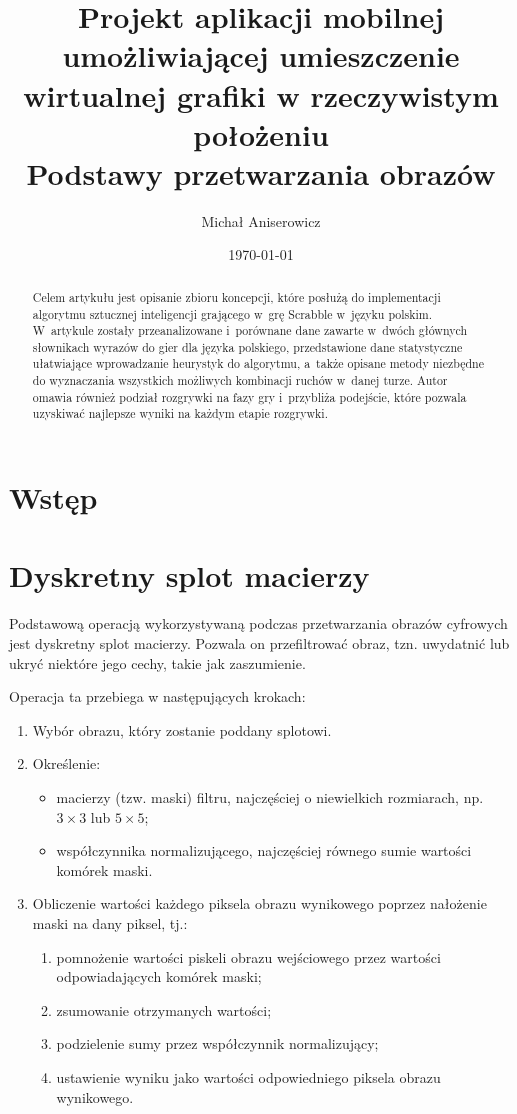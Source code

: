 \documentclass[a4paper,twocolumn,12pt]{article}
\title{
 \LARGE{Projekt aplikacji mobilnej umożliwiającej umieszczenie wirtualnej grafiki w rzeczywistym położeniu} 
 \\ \vspace{2mm} 
 \large{Podstawy przetwarzania obrazów}
}
\author{Michał Aniserowicz}
\date{\today}
\begin{document}
\maketitle

\begin{abstract}
Celem artykułu jest opisanie zbioru koncepcji, które posłużą do implementacji algorytmu sztucznej inteligencji grającego w~grę Scrabble w~języku polskim. W~artykule zostały przeanalizowane i~porównane dane zawarte w~dwóch głównych słownikach wyrazów do gier dla języka polskiego, przedstawione dane statystyczne ułatwiające wprowadzanie heurystyk do algorytmu, a~także opisane metody niezbędne do wyznaczania wszystkich możliwych kombinacji ruchów w~danej turze. Autor omawia również podział rozgrywki na fazy gry i~przybliża podejście, które pozwala uzyskiwać najlepsze wyniki na każdym etapie rozgrywki.
\end{abstract}

\section{Wstęp}



\section{Dyskretny splot macierzy}

Podstawową operacją wykorzystywaną podczas przetwarzania obrazów cyfrowych jest dyskretny splot macierzy.
Pozwala on przefiltrować obraz, tzn. uwydatnić lub ukryć niektóre jego cechy, takie jak zaszumienie.

Operacja ta przebiega w następujących krokach:

\begin{enumerate}
 \item Wybór obrazu, który zostanie poddany splotowi.
 \item Określenie:
  \begin{itemize}
   \item macierzy (tzw. maski) filtru, najczęściej o niewielkich rozmiarach, np. $3 \times 3$ lub $5 \times 5$;
   \item współczynnika normalizującego, najczęściej równego sumie wartości komórek maski.
  \end{itemize}
 \item Obliczenie wartości każdego piksela obrazu wynikowego poprzez nałożenie maski na dany piksel, tj.:
  \begin{enumerate}
   \item pomnożenie wartości piskeli obrazu wejściowego przez wartości odpowiadających komórek maski;
   \item zsumowanie otrzymanych wartości;
   \item podzielenie sumy przez współczynnik normalizujący;
   \item ustawienie wyniku jako wartości odpowiedniego piksela obrazu wynikowego.
  \end{enumerate}
\end{enumerate}
\end{document}
